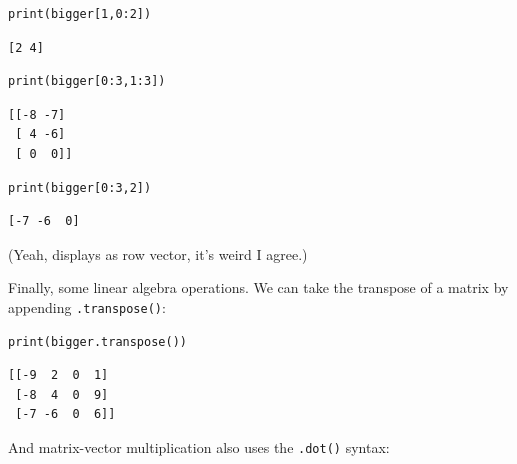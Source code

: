 \begin{Verbatim}[fontsize=\small,samepage=true,frame=single,framesep=3mm]
print(bigger[1,0:2])
\end{Verbatim}
\vspace{-.2in}

\begin{Verbatim}[fontsize=\small,samepage=true,frame=leftline,framesep=5mm,framerule=1mm]
[2 4]
\end{Verbatim}

\begin{Verbatim}[fontsize=\small,samepage=true,frame=single,framesep=3mm]
print(bigger[0:3,1:3])
\end{Verbatim}
\vspace{-.2in}

\begin{Verbatim}[fontsize=\small,samepage=true,frame=leftline,framesep=5mm,framerule=1mm]
[[-8 -7]
 [ 4 -6]
 [ 0  0]]
\end{Verbatim}

\begin{Verbatim}[fontsize=\small,samepage=true,frame=single,framesep=3mm]
print(bigger[0:3,2])
\end{Verbatim}
\vspace{-.2in}

\begin{Verbatim}[fontsize=\small,samepage=true,frame=leftline,framesep=5mm,framerule=1mm]
[-7 -6  0]
\end{Verbatim}

(Yeah, displays as row vector, it's weird I agree.)

\medskip
{}

Finally, some linear algebra operations. We can take the transpose of a matrix
by appending \texttt{.transpose()}:

\begin{Verbatim}[fontsize=\small,samepage=true,frame=single,framesep=3mm]
print(bigger.transpose())
\end{Verbatim}
\vspace{-.2in}

\begin{Verbatim}[fontsize=\small,samepage=true,frame=leftline,framesep=5mm,framerule=1mm]
[[-9  2  0  1]
 [-8  4  0  9]
 [-7 -6  0  6]]
\end{Verbatim}


And matrix-vector multiplication also uses the \texttt{.dot()} syntax:

